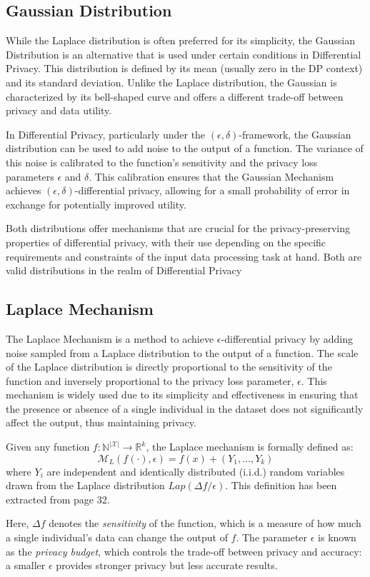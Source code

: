 \subsection{Gaussian Distribution}

While the Laplace distribution is often preferred for its simplicity, the Gaussian Distribution is an alternative that is used under certain conditions in Differential Privacy. This distribution is defined by its mean (usually zero in the DP context) and its standard deviation. Unlike the Laplace distribution, the Gaussian is characterized by its bell-shaped curve and offers a different trade-off between privacy and data utility.

In Differential Privacy, particularly under the $(\epsilon, \delta)$-framework, the Gaussian distribution can be used to add noise to the output of a function. The variance of this noise is calibrated to the function's sensitivity and the privacy loss parameters $\epsilon$ and $\delta$. This calibration ensures that the Gaussian Mechanism achieves $(\epsilon, \delta)$-differential privacy, allowing for a small probability of error in exchange for potentially improved utility\citep[p. 31]{Dwork2014}.

Both distributions offer mechanisms that are crucial for the privacy-preserving properties of differential privacy, with their use depending on the specific requirements and constraints of the input data processing task at hand. Both are valid distributions in the realm of Differential Privacy

\subsection{Laplace Mechanism}
The Laplace Mechanism is a method to achieve $\epsilon$-differential privacy by adding noise sampled from a Laplace distribution to the output of a function. The scale of the Laplace distribution is directly proportional to the sensitivity of the function and inversely proportional to the privacy loss parameter, $\epsilon$. This mechanism is widely used due to its simplicity and effectiveness in ensuring that the presence or absence of a single individual in the dataset does not significantly affect the output, thus maintaining privacy.
\begin{definition}
Given any function $f: \mathbb{N}^{|\mathcal{X}|} \rightarrow \mathbb{R}^k$, the Laplace mechanism is formally defined as:
\begin{equation}
\mathcal{M}_L(f(\cdot), \epsilon) = f(x) + (Y_1, \ldots, Y_k)
\end{equation}
where $Y_i$ are independent and identically distributed (i.i.d.) random variables drawn from the Laplace distribution $Lap(\Delta f/\epsilon)$. This definition has been extracted from \citeauthor{Dwork2014} page 32.
\end{definition}
Here, $\Delta f$ denotes the \textit{sensitivity} of the function, which is a measure of how much a single individual's data can change the output of $f$. The parameter $\epsilon$ is known as the \textit{privacy budget}, which controls the trade-off between privacy and accuracy: a smaller $\epsilon$ provides stronger privacy but less accurate results.

